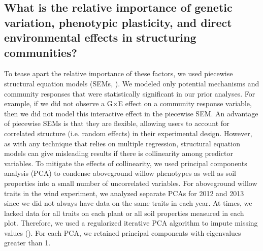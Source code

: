 \documentclass[11pt]{article}
\begin{document}
\subsection*{What is the relative importance of genetic variation, phenotypic plasticity, and direct environmental effects in
structuring
communities?}









To tease apart the relative importance of these factors,
we used piecewise
structural equation models (SEMs, \citealt{Lefcheck_2015}). 
We modeled only
potential mechanisms and community responses that were statistically
significant in our prior analyses. For example, if we did not observe a
G$\times$E effect on a community response variable, then we did
not model this interactive effect in the piecewise SEM. An advantage of
piecewise SEMs is that they are flexible, allowing users to account for
correlated structure (i.e. random effects) in their experimental design.
However, as with any technique that relies on multiple regression,
structural equation models can give misleading results if there is
collinearity among predictor variables. To mitigate the effects of
collinearity, we used principal components analysis (PCA) to condense
aboveground willow phenotypes as well as soil properties into a small
number of uncorrelated variables. For aboveground willow traits in the
wind experiment, we analyzed separate PCAs for 2012 and 2013 since we
did not always have data on the same traits in each year. At times, we
lacked data for all traits on each plant or all soil properties measured
in each plot. Therefore, we used a regularized iterative PCA algorithm
to impute missing values (\citealt{josse2012handling}). For each PCA, we retained
principal components with eigenvalues greater than 1.
\end{document}
